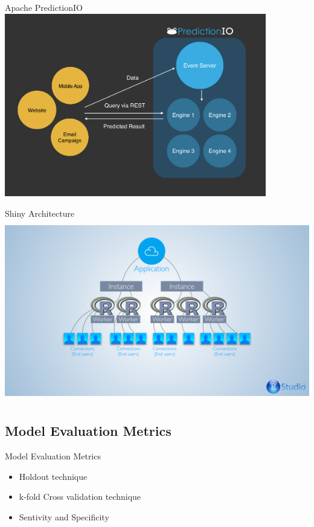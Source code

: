 \documentclass{beamer}
\begin{document}
\begin{frame}{Apache PredictionIO}
	\includegraphics[width=\textwidth,height=8cm]{figures/predictionioeventsever.png}
\end{frame}

\begin{frame}{Shiny Architecture}
	\includegraphics[width=\textwidth,height=8cm]{figures/shinyscaling.png}
	\end{frame}
	
	
\subsection{Model Evaluation Metrics}
\begin{frame}{Model Evaluation Metrics}
	\begin{itemize}
		\item Holdout technique
		\item k-fold Cross validation technique
		\item Sentivity and Specificity
	\end{itemize}
\end{frame}
\end{document}
